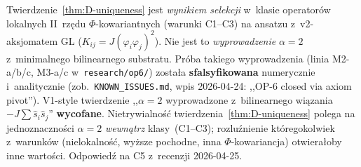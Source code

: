 \begin{remark}[Status $\alpha=2$ po~v2-pivocie --- 2026-04-25]%
\label{rem:alpha2-pivot-status-pl}
Twierdzenie~\ref{thm:D-uniqueness} jest \emph{wynikiem
selekcji} w~klasie operator\'ow lokalnych II~rz\k{e}du
$\Phi$-kowariantnych (warunki C1--C3) na ansatzu z~v2-aksjomatem
GL ($K_{ij} = J(\varphi_i\varphi_j)^2$). Nie jest to
\emph{wyprowadzenie} $\alpha=2$ z~minimalnego bilinearnego
substratu. Pr\'oba takiego wyprowadzenia (linia M2-a/b/c, M3-a/c
w~\texttt{research/op6/}) zosta\l{}a \textbf{sfalsyfikowana}
numerycznie i~analitycznie (zob.\ \texttt{KNOWN\_ISSUES.md},
wpis 2026-04-24: ,,OP-6 closed via axiom pivot''). V1-style
twierdzenie ,,$\alpha=2$ wyprowadzone z~bilinearnego wi\k{a}zania
$-J\sum\hat{s}_i\hat{s}_j$'' \textbf{wycofane}. Nietrywialno\'s\'c
twierdzenia~\ref{thm:D-uniqueness} polega na jednoznaczno\'sci
$\alpha=2$ \emph{wewn\k{a}trz} klasy~(C1--C3); rozlu\'znienie
kt\'oregokolwiek z~warunk\'ow (nielokalno\'s\'c, wy\.zsze pochodne,
inna $\Phi$-kowariancja) otwiera\l{}oby inne warto\'sci.
Odpowied\'z na C5 z~recenzji 2026-04-25.


\end{remark}
